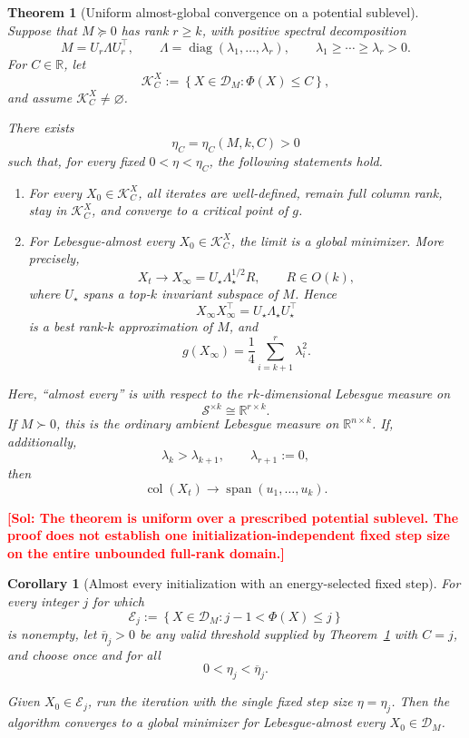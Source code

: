 \documentclass[11pt]{article}
\newcommand{\RR}{\mathbb{R}}
\newcommand{\col}{\operatorname{col}}
\newcommand{\diag}{\operatorname{diag}}
\newcommand{\Span}{\operatorname{span}}
\newcommand{\cD}{\mathcal{D}}
\newcommand{\cE}{\mathcal{E}}
\newcommand{\cS}{\mathcal{S}}
\newcommand{\cK}{\mathcal{K}}
\newcommand{\sol}[1]{\textcolor{red}{\textbf{[Sol: #1]}}}
\newtheorem{theorem}{Theorem}
\newtheorem{corollary}{Corollary}
\begin{document}
\begin{theorem}[Uniform almost-global convergence on a potential sublevel]
\label{thm:main}
Suppose that \(M\succeq0\) has rank \(r\ge k\), with positive spectral
decomposition
\[
M
=
U_r\Lambda U_r^\top,
\qquad
\Lambda
=
\diag(\lambda_1,\ldots,\lambda_r),
\qquad
\lambda_1\ge\cdots\ge\lambda_r>0.
\]
For \(C\in\RR\), let
\[
\cK_C^X
:=
\left\{
X\in\cD_M:\Phi(X)\le C
\right\},
\]
and assume \(\cK_C^X\neq\varnothing\).

There exists
\[
\eta_C=\eta_C(M,k,C)>0
\]
such that, for every fixed \(0<\eta<\eta_C\), the following statements hold.

\begin{enumerate}[label=(\roman*)]
    \item For every \(X_0\in\cK_C^X\), all iterates are well-defined,
    remain full column rank, stay in \(\cK_C^X\), and converge to a critical
    point of \(g\).

    \item For Lebesgue-almost every \(X_0\in\cK_C^X\), the limit is a global
    minimizer. More precisely,
    \[
    X_t\longrightarrow
    X_\infty
    =
    U_\star\Lambda_\star^{1/2}R,
    \qquad
    R\in O(k),
    \]
    where \(U_\star\) spans a top-\(k\) invariant subspace of \(M\). Hence
    \[
    X_\infty X_\infty^\top
    =
    U_\star\Lambda_\star U_\star^\top
    \]
    is a best rank-\(k\) approximation of \(M\), and
    \[
    g(X_\infty)
    =
    \frac14\sum_{i=k+1}^r\lambda_i^2.
    \]
\end{enumerate}

Here, ``almost every'' is with respect to the \(rk\)-dimensional Lebesgue
measure on
\[
\cS^{\times k}\cong\RR^{r\times k}.
\]
If \(M\succ0\), this is the ordinary ambient Lebesgue measure on
\(\RR^{n\times k}\). If, additionally,
\[
\lambda_k>\lambda_{k+1},
\qquad
\lambda_{r+1}:=0,
\]
then
\[
\col(X_t)
\longrightarrow
\Span(u_1,\ldots,u_k).
\]
\end{theorem}

\sol{The theorem is uniform over a prescribed potential sublevel. The proof does not establish one initialization-independent fixed step size on the entire unbounded full-rank domain.}

\begin{corollary}[Almost every initialization with an energy-selected fixed step]
\label{cor:shell}
For every integer \(j\) for which
\[
\cE_j
:=
\left\{
X\in\cD_M:j-1<\Phi(X)\le j
\right\}
\]
is nonempty, let \(\overline\eta_j>0\) be any valid threshold supplied by
Theorem~\ref{thm:main} with \(C=j\), and choose once and for all
\[
0<\eta_j<\overline\eta_j.
\]

Given \(X_0\in\cE_j\), run the iteration with the single fixed step size
\(\eta=\eta_j\). Then the algorithm converges to a global minimizer for
Lebesgue-almost every \(X_0\in\cD_M\).
\end{corollary}
\end{document}
